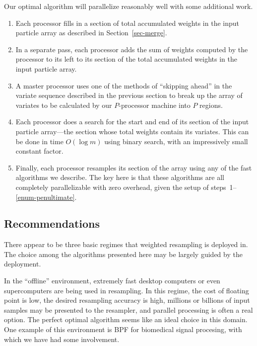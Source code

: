 \documentclass[12pt]{article}
\begin{document}
  Our optimal algorithm will parallelize reasonably well
  with some additional work. 
  \begin{enumerate}
  \item Each processor fills in a section of total
    accumulated weights in the input particle array as
    described in Section~\ref{sec-merge}.
  \item In a separate pass, each processor adds the sum of
    weights computed by the processor to its left to its
    section of the total accumulated weights in the input
    particle array.
  \item A master processor uses one of the methods of
    ``skipping ahead'' in the variate
    sequence described in the previous section to break up the
    array of variates to be calculated by our $P$-processor
    machine into $P$ regions.
  \item \label{enum-penultimate} Each processor does a search for the start and end
    of its section of the input particle array---the section
    whose total weights contain its variates.  This can be done in time
    $O(\log m)$ using binary search, with an impressively
    small constant factor.
  \item Finally, each processor resamples its section of the array
    using any of the fast algorithms we describe.  The key
    here is that these algorithms are all completely
    parallelizable with zero overhead, given the setup of
    steps~1--\ref{enum-penultimate}.
  \end{enumerate}

\subsection{Recommendations}

  There appear to be three basic regimes that weighted
  resampling is deployed in.  The choice among the algorithms
  presented here may be largely guided by the deployment.

  In the ``offline'' environment, extremely fast desktop
  computers or even supercomputers are being used in
  resampling.  In this regime, the cost of floating point is
  low, the desired resampling accuracy is high, millions or
  billions of input samples may be presented to the
  resampler, and parallel processing is often a real option.
  The perfect optimal algorithm seems like an ideal choice
  in this domain.  One example of this environment is BPF
  for biomedical signal procesing, with which we have had
  some involvement.
\end{document}
